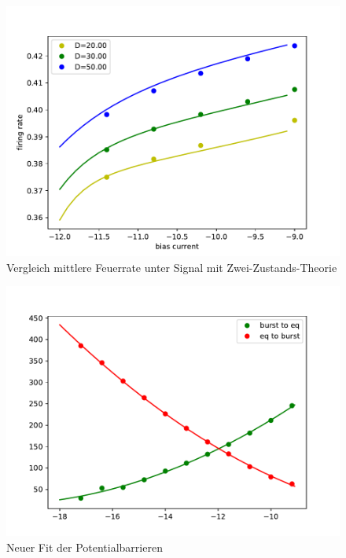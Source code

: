 \documentclass[12pt,a4paper]{article}
\begin{document}
\begin{figure}[H]
	\centering
	\includegraphics[scale=1]{gcompratepoi17dnolog.pdf}\caption{Vergleich mittlere Feuerrate unter Signal mit Zwei-Zustands-Theorie}
	\label{gcompraterinzelsig}
\end{figure}
\begin{figure}[H]
	\centering
	\includegraphics[scale=1]{barrierinzelfit4.pdf}\caption{Neuer Fit der Potentialbarrieren}
	\label{barrierinzelfit}
\end{figure}
\newpage
\end{document}
